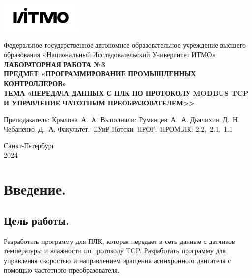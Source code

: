 \documentclass[a4paper, 12pt]{article}
\begin{document}
    \begin{titlepage}

        \begin{center}
        \includegraphics[width=0.3\textwidth]{itmo.png} %
        \vfill

        Федеральное государственное автономное образовательное учреждение высшего образования
        «Национальный Исследовательский Университет ИТМО»\\

        \vfill
        {\large\bf ЛАБОРАТОРНАЯ РАБОТА №3}\\
        {\large\bf ПРЕДМЕТ «ПРОГРАММИРОВАНИЕ ПРОМЫШЛЕННЫХ КОНТРОЛЛЕРОВ»}\\
        {\large\bf ТЕМА «ПЕРЕДАЧА ДАННЫХ С ПЛК ПО ПРОТОКОЛУ MODBUS TCP И УПРАВЛЕНИЕ ЧАТОТНЫМ ПРЕОБРАЗОВАТЕЛЕМ>>}
        \vfill

        \begin{flushright}
            \begin{minipage}{.45\textwidth}
                {
                    \hbox{Преподаватель:}
                    \hbox{Крылова А. А.}
                    \hbox{}
                    \hbox{Выполнили:}
                    \hbox{Румянцев А. А.}
                    \hbox{Дьячихин Д. Н.}
                    \hbox{Чебаненко Д. А.}
                    \hbox{}
                    \hbox{Факультет: СУиР}
                    \hbox{Потоки ПРОГ. ПРОМ.ЛК:}
                    \hbox{2.2, 2.1, 1.1}
                }
            \end{minipage}
        \end{flushright}

        \vfill

        Санкт-Петербург\\
        2024
        \end{center}
    \end{titlepage}
    
    \tableofcontents

    \newpage
    \section{Введение.}
    \subsection{Цель работы.}
    Разработать программу для ПЛК, которая передает в сеть
    данные с датчиков температуры и влажности по протоколу TCP. Разработать программу для управления скоростью и
    направлением вращения асинхронного двигателя с помощью частотного преобразователя.
\end{document}
